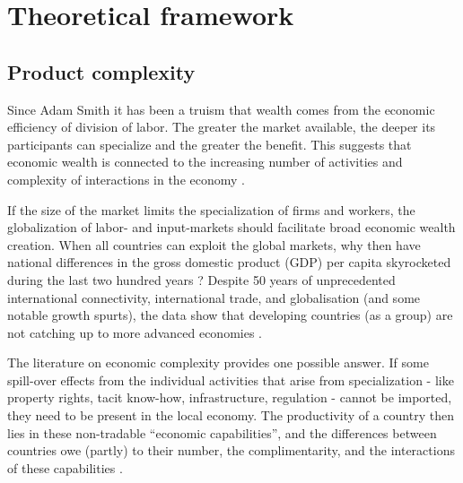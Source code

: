 \documentclass[11pt]{article}
\begin{document}

\section{Theoretical framework}%
\label{sec:framework}

\subsection{Product complexity}
\label{sec:frame-product-complexity}

Since Adam Smith it has been a truism that wealth comes from the economic efficiency of division of labor. The greater the market available, the deeper its participants can specialize and the greater the benefit. This suggests that economic wealth is connected to the increasing number of activities and complexity of interactions in the economy \citep{romer_endogenous_1990}.

If the size of the market limits the specialization of firms and workers, the globalization of labor- and input-markets should facilitate broad economic wealth creation. When all countries can exploit the global markets, why then have national differences in the gross domestic product (GDP) per capita skyrocketed during the last two hundred years \citep{pritchett_divergence_1997}? Despite 50 years of unprecedented international connectivity, international trade, and globalisation (and some notable growth spurts), the data show that developing countries (as a group) are not catching up to more advanced economies \citep{johnson_what_2020}.

The literature on economic complexity provides one possible answer. If some spill-over effects from the individual activities that arise from  specialization - like property rights, tacit know-how, infrastructure, regulation - cannot be imported, they need to be present in the local economy. The productivity of a country then lies in these non-tradable ``economic capabilities'', and the differences between countries owe (partly) to their number, the complimentarity, and the interactions of these capabilities \citep{hidalgo_product_2007,hausmann_atlas_2013}.
\end{document}
